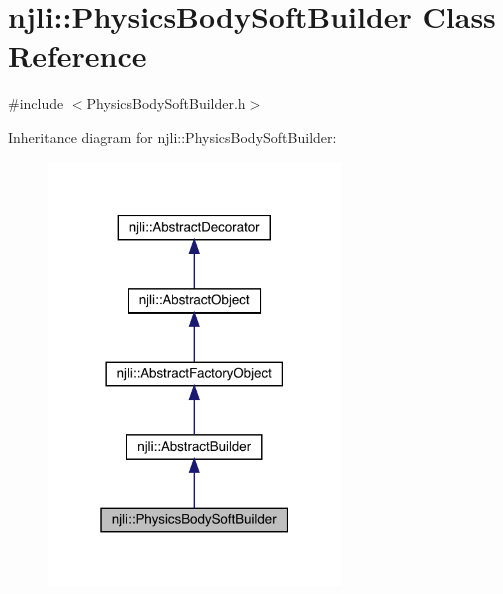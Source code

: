 \hypertarget{classnjli_1_1_physics_body_soft_builder}{}\section{njli\+:\+:Physics\+Body\+Soft\+Builder Class Reference}
\label{classnjli_1_1_physics_body_soft_builder}


{\ttfamily \#include $<$Physics\+Body\+Soft\+Builder.\+h$>$}



Inheritance diagram for njli\+:\+:Physics\+Body\+Soft\+Builder\+:\nopagebreak
\begin{figure}[H]
\begin{center}
\leavevmode
\includegraphics[width=220pt]{classnjli_1_1_physics_body_soft_builder__inherit__graph}
\end{center}
\end{figure}


